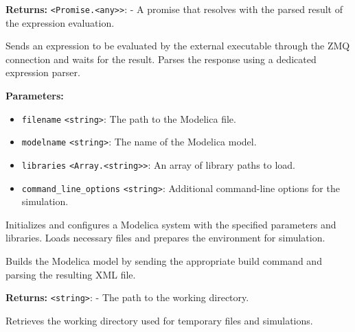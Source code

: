 \documentclass[12pt,a4paper]{article}
\begin{document}
\noindent \textbf{Returns:} \texttt{<Promise.<any>>}: - A promise that resolves with the parsed result of the expression evaluation.

\noindent Sends an expression to be evaluated by the external executable through the ZMQ connection and waits for the result.
Parses the response using a dedicated expression parser.

\vspace{5mm}
\noindent {}


\noindent \textbf{Parameters:}
\begin{itemize}
  \item \texttt{filename} \texttt{<string>}: The path to the Modelica file.
  \item \texttt{modelname} \texttt{<string>}: The name of the Modelica model.
  \item \texttt{libraries} \texttt{<Array.<string>>}: An array of library paths to load.
  \item \texttt{command\_line\_options} \texttt{<string>}: Additional command-line options for the simulation.
\end{itemize}

\noindent Initializes and configures a Modelica system with the specified parameters and libraries.
Loads necessary files and prepares the environment for simulation.

\vspace{5mm}
\noindent {}


\noindent Builds the Modelica model by sending the appropriate build command and parsing the resulting XML file.

\vspace{5mm}
\noindent {}


\noindent \textbf{Returns:} \texttt{<string>}: - The path to the working directory.

\noindent Retrieves the working directory used for temporary files and simulations.

\vspace{5mm}
\noindent {}
\end{document}
